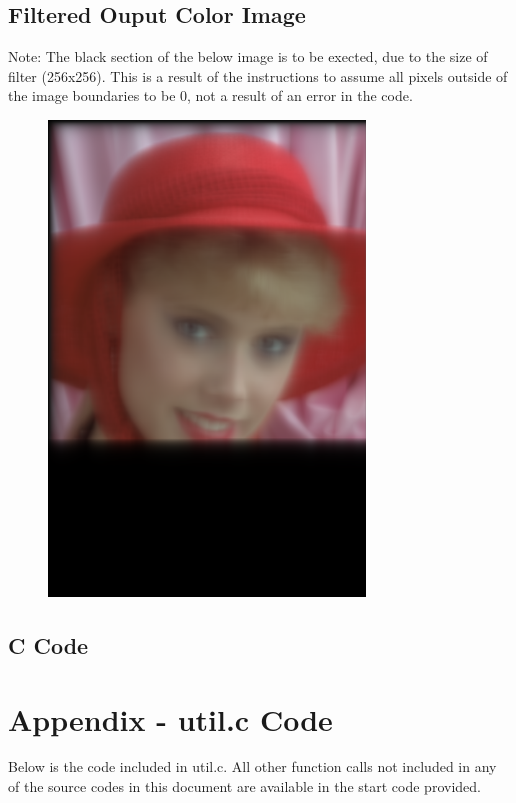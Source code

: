 \documentclass{article}
\begin{document}
\subsection{Filtered Ouput Color Image}
Note: The black section of the below image is to be exected, due to the size of filter (256x256). This is a result of the instructions to assume all pixels outside of the image boundaries to be 0, not a result of an error in the code.
\begin{figure}[H]
    \centering
    \includegraphics[width=0.75\textwidth]{../results/section5.png}
    \begin{center}
    \end{center}
\end{figure}
\subsection{C Code}


\section{Appendix - util.c Code}
Below is the code included in util.c. All other function calls not included in any of the source codes in this document are available in the start code provided.

\end{document}
